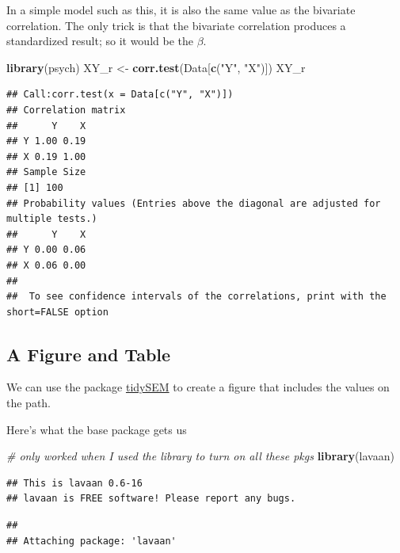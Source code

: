 \documentclass[
  11pt,
]{book}
\newenvironment{Shaded}{\begin{snugshade}}{\end{snugshade}}
\newcommand{\CommentTok}[1]{\textcolor[rgb]{0.37,0.37,0.37}{\textit{#1}}}
\newcommand{\FunctionTok}[1]{\textcolor[rgb]{0.27,0.27,0.27}{\textbf{#1}}}
\newcommand{\NormalTok}[1]{#1}
\newcommand{\OtherTok}[1]{\textcolor[rgb]{0.37,0.37,0.37}{#1}}
\newcommand{\StringTok}[1]{\textcolor[rgb]{0.5,0.5,0.5}{#1}}
\begin{document}
In a simple model such as this, it is also the same value as the bivariate correlation. The only trick is that the bivariate correlation produces a standardized result; so it would be the \(\beta\).

\begin{Shaded}
\begin{Highlighting}[]
\FunctionTok{library}\NormalTok{(psych)}
\NormalTok{XY\_r }\OtherTok{\textless{}{-}} \FunctionTok{corr.test}\NormalTok{(Data[}\FunctionTok{c}\NormalTok{(}\StringTok{"Y"}\NormalTok{, }\StringTok{"X"}\NormalTok{)])}
\NormalTok{XY\_r}
\end{Highlighting}
\end{Shaded}

\begin{verbatim}
## Call:corr.test(x = Data[c("Y", "X")])
## Correlation matrix 
##      Y    X
## Y 1.00 0.19
## X 0.19 1.00
## Sample Size 
## [1] 100
## Probability values (Entries above the diagonal are adjusted for multiple tests.) 
##      Y    X
## Y 0.00 0.06
## X 0.06 0.00
## 
##  To see confidence intervals of the correlations, print with the short=FALSE option
\end{verbatim}

\hypertarget{a-figure-and-table}{%
\subsection{A Figure and Table}\label{a-figure-and-table}}

We can use the package \href{https://cjvanlissa.github.io/tidySEM/articles/Plotting_graphs.html}{tidySEM} to create a figure that includes the values on the path.

Here's what the base package gets us

\begin{Shaded}
\begin{Highlighting}[]
\CommentTok{\# only worked when I used the library to turn on all these pkgs}
\FunctionTok{library}\NormalTok{(lavaan)}
\end{Highlighting}
\end{Shaded}

\begin{verbatim}
## This is lavaan 0.6-16
## lavaan is FREE software! Please report any bugs.
\end{verbatim}

\begin{verbatim}
## 
## Attaching package: 'lavaan'
\end{verbatim}
\end{document}
